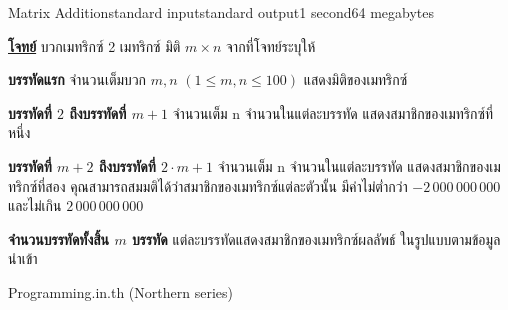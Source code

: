 \documentclass[11pt,a4paper]{article}
\begin{document}
\begin{problem}{Matrix Addition}{standard input}{standard output}{1 second}{64 megabytes}

\underline{\textbf{โจทย์}} บวกเมทริกซ์ 2 เมทริกซ์ มิติ $m \times n$ จากที่โจทย์ระบุให้

\InputFile

\textbf{บรรทัดแรก} จำนวนเต็มบวก $m , n $ $(1 \leq m , n \leq 100)$ แสดงมิติของเมทริกซ์

\textbf{บรรทัดที่ $2$ ถึงบรรทัดที่ $m + 1$} จำนวนเต็ม n จำนวนในแต่ละบรรทัด แสดงสมาชิกของเมทริกซ์ที่หนึ่ง

\textbf{บรรทัดที่ $m + 2$ ถึงบรรทัดที่ $2 \cdot m + 1$} จำนวนเต็ม n จำนวนในแต่ละบรรทัด แสดงสมาชิกของเมทริกซ์ที่สอง คุณสามารถสมมติได้ว่าสมาชิกของเมทริกซ์แต่ละตัวนั้น มีค่าไม่ต่ำกว่า $-2\,000\,000\,000$ และไม่เกิน $2\,000\,000\,000$

\OutputFile

\textbf{จำนวนบรรทัดทั้งสิ้น $m$ บรรทัด} แต่ละบรรทัดแสดงสมาชิกของเมทริกซ์ผลลัพธ์ ในรูปแบบตามข้อมูลนำเข้า

\Examples

\begin{example}
%
\end{example}

\Source

Programming.in.th (Northern series)

\end{problem}
\end{document}
